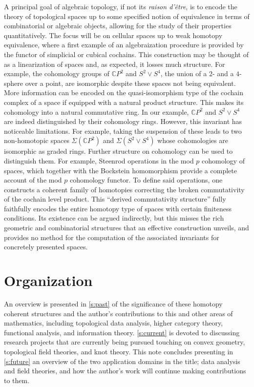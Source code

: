 A principal goal of algebraic topology, if not its \emph{raison d'\^{e}tre}, is to encode the theory of topological spaces up to some specified notion of equivalence in terms of combinatorial or algebraic objects, allowing for the study of their properties quantitatively.
The focus will be on cellular spaces up to weak homotopy equivalence, where a first example of an algebraization procedure is provided by the functor of simplicial or cubical cochains.
This construction may be thought of as a linearization of spaces and, as expected, it losses much structure.
For example, the cohomology groups of $\mathbb{C} P^2$ and $S^2 \vee S^4$, the union of a $2$- and a $4$-sphere over a point, are isomorphic despite these spaces not being equivalent.
More information can be encoded on the quasi-isomorphism type of the cochain complex of a space if equipped with a natural product structure.
This makes its cohomology into a natural commutative ring.
In our example, $\mathbb{C} P^2$ and $S^2 \vee S^4$ are indeed distinguished by their cohomology rings.
However, this invariant has noticeable limitations.
For example, taking the suspension of these leads to two non-homotopic spaces $\Sigma(\mathbb{C} P^2)$ and $\Sigma(S^2 \vee S^4)$ whose cohomologies are isomorphic as graded rings.
Further structure on cohomology can be used to distinguish them.
For example, Steenrod operations in the mod $p$ cohomology of spaces, which together with the Bockstein homomorphism provide a complete account of the mod $p$ cohomology functor.
To define said operations, one constructs a coherent family of homotopies correcting the broken commutativity of the cochain level product.
This ``derived commutativity structure'' fully faithfully encodes the entire homotopy type of spaces with certain finiteness conditions.
Its existence can be argued indirectly, but this misses the rich geometric and combinatorial structures that an effective construction unveils, and provides no method for the computation of the associated invariants for concretely presented spaces.

\section*{Organization}

An overview is presented in \cref{s:past} of the significance of these homotopy coherent structures and the author's contributions to this and other areas of mathematics, including topological data analysis, higher category theory, functional analysis, and information theory.
\cref{s:current} is devoted to discussing research projects that are currently being pursued touching on convex geometry, topological field theories, and knot theory.
This note concludes presenting in \cref{s:future} an overview of the two application domains in the title; data analysis and field theories, and how the author's work will continue making contributions to them.
